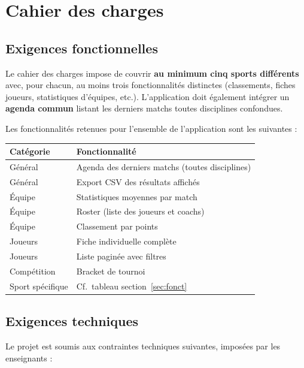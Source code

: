 \documentclass[12pt,a4paper]{article}
\begin{document}
\section{Cahier des charges}
\label{sec:cdc}

\subsection{Exigences fonctionnelles}

Le cahier des charges impose de couvrir \textbf{au minimum cinq sports
différents} avec, pour chacun, au moins trois fonctionnalités distinctes
(classements, fiches joueurs, statistiques d'équipes, etc.). L'application
doit également intégrer un \textbf{agenda commun} listant les derniers matchs
toutes disciplines confondues.

Les fonctionnalités retenues pour l'ensemble de l'application sont les
suivantes :

\begin{center}
\begin{tabularx}{\textwidth}{lX}
  \toprule
  \textbf{Catégorie} & \textbf{Fonctionnalité} \\
  \midrule
  Général & Agenda des derniers matchs (toutes disciplines) \\
  Général & Export CSV des résultats affichés \\
  Équipe  & Statistiques moyennes par match \\
  Équipe  & Roster (liste des joueurs et coachs) \\
  Équipe  & Classement par points \\
  Joueurs & Fiche individuelle complète \\
  Joueurs & Liste paginée avec filtres \\
  Compétition & Bracket de tournoi \\
  Sport spécifique & Cf.\ tableau section~\ref{sec:fonct} \\
  \bottomrule
\end{tabularx}
\end{center}

\subsection{Exigences techniques}

Le projet est soumis aux contraintes techniques suivantes, imposées par les
enseignants :
\end{document}
